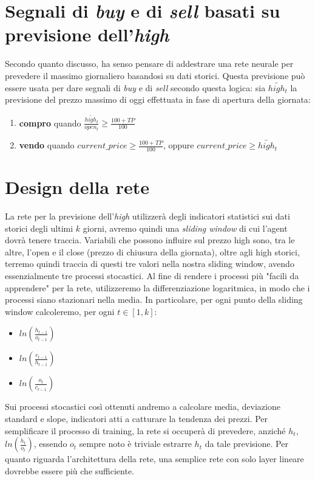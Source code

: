 \documentclass[binding=0.6cm]{sapthesis}
\begin{document}
		\section{Segnali di \textit{buy} e di \textit{sell} basati su previsione dell'\textit{high}}
			Secondo quanto discusso, ha senso pensare di addestrare una rete neurale per prevedere il massimo giornaliero basandosi su dati storici. Questa previsione può essere usata per dare segnali di
			\textit{buy} e di \textit{sell} secondo questa logica: sia $\tilde{high_t}$ la previsione del prezzo massimo di oggi effettuata in fase di apertura della giornata:
			\begin{enumerate}
				\item \textbf{compro} quando $\frac{\tilde{high_t}}{open_t} \geq \frac{100+TP}{100}$
				\item \textbf{vendo} quando $current\_price \geq \frac{100+TP}{100}$, oppure $current\_price \geq \tilde{high_t}$
			\end{enumerate}
		\section{Design della rete}
			La rete per la previsione dell'\textit{high} utilizzerà degli indicatori statistici sui dati storici degli ultimi $k$ giorni, avremo quindi una \textit{sliding window} di cui l'agent dovrà tenere traccia.
			Variabili che possono influire sul prezzo high sono, tra le altre, l'open e il close (prezzo di chiusura della giornata), oltre agli high storici, terremo quindi traccia di questi tre
			valori nella nostra sliding window, avendo essenzialmente tre processi stocastici. Al fine di rendere i processi più "facili da apprendere" per la rete, utilizzeremo la differenziazione
			logaritmica, in modo che i processi siano stazionari nella media. In particolare, per ogni punto della sliding window calcoleremo, per ogni $t \in [1, k]$:
			\begin{itemize}
				\item $ln(\frac{h_{t-1}}{o_{t-1}})$
				\item $ln(\frac{c_{t-1}}{h_{t-1}})$
				\item $ln(\frac{o_{t}}{c_{t-1}})$
			\end{itemize}
			Sui processi stocastici così ottenuti andremo a calcolare media, deviazione standard e slope, indicatori atti a catturare la tendenza dei prezzi. Per semplificare il processo di training,
			la rete si occuperà di prevedere, anziché $h_t$, $ln(\frac{h_t}{o_t})$, essendo $o_t$ sempre noto è triviale estrarre $h_t$ da tale previsione.
			Per quanto riguarda l'architettura della rete, una semplice rete con solo layer lineare dovrebbe essere più che sufficiente.
\end{document}
